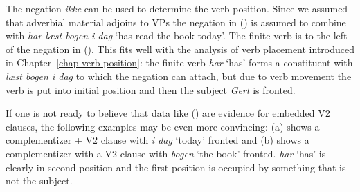 The negation \emph{ikke} can be used to determine the verb position. Since we assumed that adverbial
material adjoins to VPs the negation in () is assumed to combine with \emph{har læst bogen i
  dag} `has read the book today'. The finite verb is to the left of the negation in (). This
fits well with the analysis of verb placement introduced in Chapter~\ref{chap-verb-position}: the
finite verb \emph{har} `has' forms a constituent with \emph{læst  bogen i dag} to which the negation can attach, but
due to verb movement the verb is put into initial position and then the subject \emph{Gert} is fronted.
\z

If one is not ready to believe that data like () are evidence for embedded V2 clauses, the
following examples may be even more convincing:
\eal
{}
\zl
(a) shows a complementizer + V2 clause with \emph{i dag} `today' fronted and (b) shows
a complementizer with a V2 clause with \emph{bogen} `the book' fronted. \emph{har} `has' is clearly
in second position and the first position is occupied by something that is not the subject.






